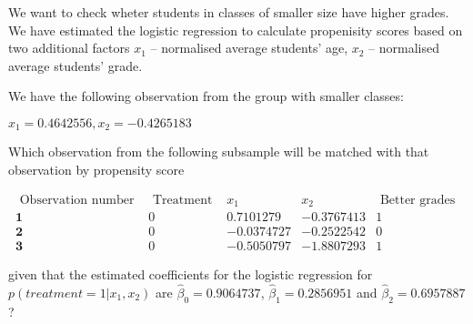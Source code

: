 
\begin{question}
We want to check wheter students in classes of smaller size have higher grades. We have estimated the logistic regression to calculate propenisity scores based on two additional factors \(x_1\) -- normalised average students' age, \(x_2\) -- normalised average students' grade.

We have the following observation from the group with smaller classes:

\(x_1=0.4642556, x_2=-0.4265183\)

Which observation from the following subsample will be matched with that observation by propensity score

\[
\begin{array}{rrrrr} 
 \text { Observation number }&  \text { Treatment } &  x_1  &  x_2  & \text { Better grades } \\
\hline 
 \mathbf{1} & 0 & 0.7101279 & -0.3767413 & 1 \\
 \mathbf{2} & 0 & -0.0374727 & -0.2522542  & 0 \\
 \mathbf{3} & 0 &  -0.5050797  & -1.8807293   & 1
\end{array}
\]

given that the estimated coefficients for the logistic regression for \(p(treatment=1|x_1,x_2)\) are \(\hat{\beta}_0 = 0.9064737\), \(\hat{\beta}_1 = 0.2856951\) and \(\hat{\beta}_2 = 0.6957887\)?
\end{question}


